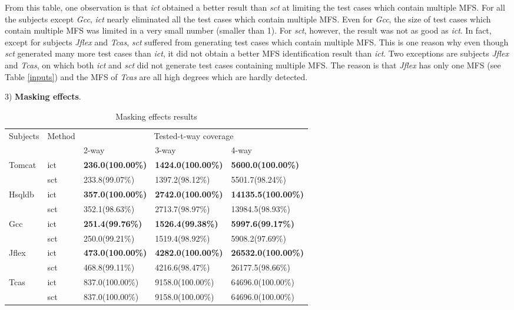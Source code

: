 \documentclass[journal,12pt,onecolumn,draftclsnofoot,]{IEEEtran}
\begin{document}
From this table, one observation is that \emph{ict} obtained a better result than \emph{sct} at limiting the test cases which contain multiple MFS. For all the subjects except \emph{Gcc}, \emph{ict} nearly eliminated all the test cases which contain multiple MFS. Even for \emph{Gcc}, the size of test cases which contain multiple MFS was limited in a very small number (smaller than 1). For \emph{sct}, however, the result was not as good as \emph{ict}. In fact, except for subjects \emph{Jflex} and \emph{Tcas}, \emph{sct} suffered from generating test cases which contain multiple MFS. This is one reason why even though \emph{sct} generated many more test cases than \emph{ict}, it did not obtain a better MFS identification result than \emph{ict}. Two exceptions are subjects \emph{Jflex} and \emph{Tcas}, on which both \emph{ict} and \emph{sct} did not generate test cases containing multiple MFS. The reason is that \emph{Jflex} has only one MFS (see Table \ref{inputs}) and the MFS of \emph{Tcas} are all high degrees which are hardly detected.


3) \textbf{Masking effects}.

\begin{table}[ht]
\centering
\caption{Masking effects results}
\label{tested-t-way}
\begin{tabular}{|ll|lll|}
\hline
\multirow{2}{*}{Subjects} & \multirow{2}{*}{Method}& \multicolumn{3}{c|}{Tested-t-way coverage}      \\ \cline{3-5}
 &  & 2-way           & 3-way            & 4-way       \\ \hline
Tomcat	&ict	&\textbf{236.0}\textbf{(100.00\%)}	&\textbf{1424.0}\textbf{(100.00\%)}	&\textbf{5600.0}\textbf{(100.00\%)}	\\
	&sct	&233.8(99.07\%)	&1397.2(98.12\%)	&5501.7(98.24\%) 	\\\hline
Hsqldb	&ict	&\textbf{357.0}\textbf{(100.00\%)}	&\textbf{2742.0}\textbf{(100.00\%)}	&\textbf{14135.5}\textbf{(100.00\%)} \\
	&sct	&352.1(98.63\%)	&2713.7(98.97\%)	&13984.5(98.93\%) 	\\\hline
Gcc	&ict	&\textbf{251.4}\textbf{(99.76\%)}	&\textbf{1526.4}\textbf{(99.38\%)}	&\textbf{5997.6}\textbf{(99.17\%)} \\
	&sct	&250.0(99.21\%)	&1519.4(98.92\%)	&5908.2(97.69\%) 	\\\hline
Jflex	&ict	&\textbf{473.0}\textbf{(100.00\%)}	&\textbf{4282.0}\textbf{(100.00\%)}	&\textbf{26532.0}\textbf{(100.00\%)} \\
	&sct	&468.8(99.11\%)	&4216.6(98.47\%)	&26177.5(98.66\%)\\\hline
Tcas	&ict	&837.0(100.00\%)	&9158.0(100.00\%)	&64696.0(100.00\%) 	\\
	&sct	&837.0(100.00\%)	&9158.0(100.00\%)	&64696.0(100.00\%) \\\hline
\end{tabular}
\end{table}
\end{document}
